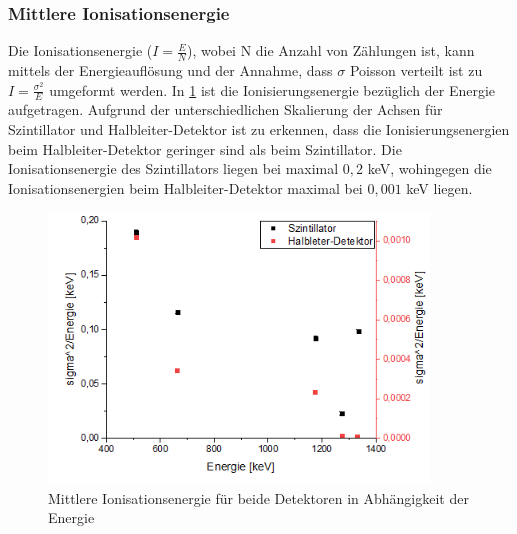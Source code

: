 \subsubsection{Mittlere Ionisationsenergie}
Die Ionisationsenergie ($I = \frac{E}{N}$), wobei N die Anzahl von Zählungen ist, kann mittels der Energieauflösung und der Annahme, dass $\sigma$ Poisson verteilt ist zu $I = \frac{\sigma^2}{E}$ umgeformt werden.
In \cref{sig2} ist die Ionisierungsenergie bezüglich der Energie aufgetragen. Aufgrund der unterschiedlichen Skalierung der Achsen für Szintillator und Halbleiter-Detektor ist zu erkennen, dass die Ionisierungsenergien beim Halbleiter-Detektor geringer sind als beim Szintillator. Die Ionisationsenergie des Szintillators liegen bei maximal $0,2$ keV, wohingegen die Ionisationsenergien beim Halbleiter-Detektor maximal bei $0,001$ keV liegen.
\begin{figure}[h!]
	\centering
	\includegraphics[width=0.9\textwidth]{sigma2.png}
	\caption{Mittlere Ionisationsenergie für beide Detektoren in Abhängigkeit der Energie}
	\label{sig2}
\end{figure}
